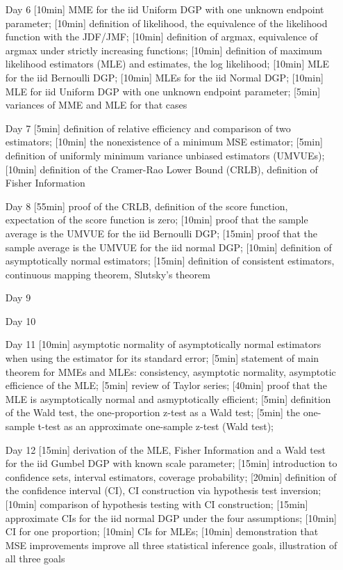 \begin{enumerate}
\item[Day 6] [10min] MME for the iid Uniform DGP with one unknown endpoint parameter; [10min] definition of likelihood, the equivalence of the likelihood function with the JDF/JMF; [10min] definition of argmax, equivalence of argmax under strictly increasing functions; [10min] definition of maximum likelihood estimators (MLE) and estimates, the log likelihood; [10min] MLE for the iid Bernoulli DGP; [10min] MLEs for the iid Normal DGP; [10min] MLE for iid Uniform DGP with one unknown endpoint parameter; [5min] variances of MME and MLE for that cases

\item[Day 7] [5min] definition of relative efficiency and comparison of two estimators; [10min] the nonexistence of a minimum MSE estimator; [5min] definition of uniformly minimum variance unbiased estimators (UMVUEs); [10min] definition of the Cramer-Rao Lower Bound (CRLB), definition of Fisher Information

\item[Day 8] [55min] proof of the CRLB, definition of the score function, expectation of the score function is zero; [10min] proof that the sample average is the UMVUE for the iid Bernoulli DGP; [15min] proof that the sample average is the UMVUE for the iid normal DGP; [10min] definition of asymptotically normal estimators; [15min] definition of consistent estimators, continuous mapping theorem, Slutsky's theorem

\item[Day 9] 
\item[Day 10] 

\item[Day 11] [10min] asymptotic normality of asymptotically normal estimators when using the estimator for its standard error; [5min] statement of main theorem for MMEs and MLEs: consistency, asymptotic normality, asymptotic efficience of the MLE; [5min] review of Taylor series; [40min] proof that the MLE is asymptotically normal and asmyptotically efficient; [5min] definition of the Wald test, the one-proportion z-test as a Wald test; [5min] the one-sample t-test as an approximate one-sample z-test (Wald test);


\item[Day 12] [15min] derivation of the MLE, Fisher Information and a Wald test for the iid Gumbel DGP with known scale parameter; [15min] introduction to confidence sets, interval estimators, coverage probability; [20min] definition of the confidence interval (CI), CI construction via hypothesis test inversion; [10min] comparison of hypothesis testing with CI construction; [15min] approximate CIs for the iid normal DGP under the four assumptions; [10min] CI for one proportion; [10min] CIs for MLEs; [10min] demonstration that MSE improvements improve all three statistical inference goals, illustration of all three goals


\end{enumerate}
